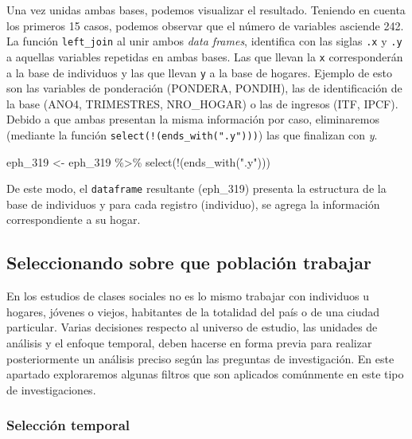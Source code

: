 \documentclass[
]{book}
\newenvironment{Shaded}{\begin{snugshade}}{\end{snugshade}}
\newcommand{\FunctionTok}[1]{\textcolor[rgb]{0.00,0.00,0.00}{#1}}
\newcommand{\NormalTok}[1]{#1}
\newcommand{\OtherTok}[1]{\textcolor[rgb]{0.56,0.35,0.01}{#1}}
\newcommand{\SpecialCharTok}[1]{\textcolor[rgb]{0.00,0.00,0.00}{#1}}
\newcommand{\StringTok}[1]{\textcolor[rgb]{0.31,0.60,0.02}{#1}}
\begin{document}
Una vez unidas ambas bases, podemos visualizar el resultado. Teniendo en cuenta los primeros 15 casos, podemos observar que el número de variables asciende 242. La función \texttt{left\_join} al unir ambos \emph{data frames}, identifica con las siglas \texttt{.x} y \texttt{.y} a aquellas variables repetidas en ambas bases. Las que llevan la \texttt{x} corresponderán a la base de individuos y las que llevan \texttt{y} a la base de hogares. Ejemplo de esto son las variables de ponderación (PONDERA, PONDIH), las de identificación de la base (ANO4, TRIMESTRES, NRO\_HOGAR) o las de ingresos (ITF, IPCF). Debido a que ambas presentan la misma información por caso, eliminaremos (mediante la función \texttt{select(!(ends\_with(".y")))}) las que finalizan con \emph{y}.

\begin{Shaded}
\begin{Highlighting}[]
\NormalTok{eph\_319 }\OtherTok{\textless{}{-}}\NormalTok{ eph\_319 }\SpecialCharTok{\%\textgreater{}\%}
    \FunctionTok{select}\NormalTok{(}\SpecialCharTok{!}\NormalTok{(}\FunctionTok{ends\_with}\NormalTok{(}\StringTok{".y"}\NormalTok{))) }
\end{Highlighting}
\end{Shaded}

De este modo, el \texttt{dataframe} resultante (eph\_319) presenta la estructura de la base de individuos y para cada registro (individuo), se agrega la información correspondiente a su hogar.

\hypertarget{seleccionando-sobre-que-poblaciuxf3n-trabajar}{%
\subsection{Seleccionando sobre que población trabajar}\label{seleccionando-sobre-que-poblaciuxf3n-trabajar}}

En los estudios de clases sociales no es lo mismo trabajar con individuos u hogares, jóvenes o viejos, habitantes de la totalidad del país o de una ciudad particular. Varias decisiones respecto al universo de estudio, las unidades de análisis y el enfoque temporal, deben hacerse en forma previa para realizar posteriormente un análisis preciso según las preguntas de investigación. En este apartado exploraremos algunas filtros que son aplicados comúnmente en este tipo de investigaciones.

\hypertarget{selecciuxf3n-temporal}{%
\subsubsection{Selección temporal}\label{selecciuxf3n-temporal}}
\end{document}
